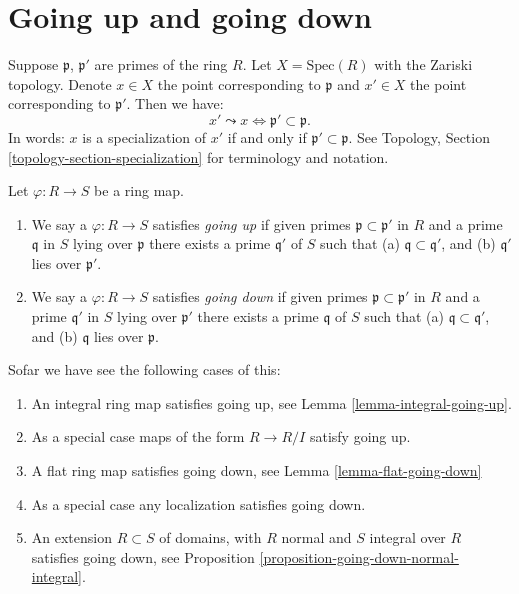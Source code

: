 \section{Going up and going down}
\label{section-going-up}

\noindent
Suppose $\mathfrak p$, $\mathfrak p'$ are primes
of the ring $R$. Let $X = \text{Spec}(R)$ with the Zariski
topology. Denote $x \in X$ the point corresponding 
to $\mathfrak p$ and $x' \in X$ the point corresponding
to $\mathfrak p'$. Then we have:
$$
x' \leadsto x \Leftrightarrow \mathfrak p' \subset \mathfrak p.
$$
In words: $x$ is a specialization of $x'$ if and
only if $\mathfrak p' \subset \mathfrak p$.
See Topology, Section \ref{topology-section-specialization}
for terminology and notation.

\begin{definition}
\label{definition-going-up-down}
Let $\varphi : R \to S$ be a ring map.
\begin{enumerate}
\item We say a $\varphi : R \to S$ satisfies {\it going up} if
given primes $\mathfrak p \subset \mathfrak p'$ in $R$
and a prime $\mathfrak q$ in $S$ lying over $\mathfrak p$
there exists a prime $\mathfrak q'$ of $S$ such that
(a) $\mathfrak q \subset \mathfrak q'$, and (b) 
$\mathfrak q'$ lies over $\mathfrak p'$.
\item We say a $\varphi : R \to S$ satisfies {\it going down} if
given primes $\mathfrak p \subset \mathfrak p'$ in $R$
and a prime $\mathfrak q'$ in $S$ lying over $\mathfrak p'$
there exists a prime $\mathfrak q$ of $S$ such that
(a) $\mathfrak q \subset \mathfrak q'$, and (b) 
$\mathfrak q$ lies over $\mathfrak p$.
\end{enumerate}
\end{definition}

\noindent
Sofar we have see the following cases of this:
\begin{enumerate}
\item An integral ring map satisfies going up, see
Lemma \ref{lemma-integral-going-up}.
\item As a special case maps of the form $R \to R/I$ satisfy
going up.
\item A flat ring map satisfies going down, see
Lemma \ref{lemma-flat-going-down}
\item As a special case any localization satisfies going down.
\item An extension $R \subset S$ of domains, with $R$ normal
and $S$ integral over $R$ satisfies going down, see
Proposition \ref{proposition-going-down-normal-integral}.
\end{enumerate}

